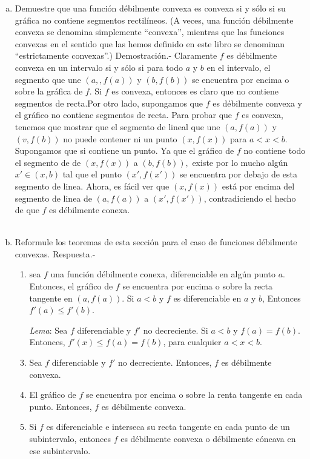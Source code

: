 \begin{enumerate}[\bfseries 1.]
\begin{enumerate}[(a)]
	    \item Demuestre que una función débilmente convexa es convexa si y sólo si su gráfica no contiene segmentos rectilíneos. (A veces, una función débilmente convexa se denomina simplemente “convexa”, mientras que las funciones convexas en el sentido que las hemos definido en este libro se denominan “estrictamente convexas”.)
		Demostración.-\; Claramente $f$ es débilmente convexa en un intervalo si y sólo si para todo $a$ y $b$ en el intervalo, el segmento que une $(a,,f(a))$ y $(b,f(b))$ se encuentra por encima o sobre la gráfica de $f$. Si $f$ es convexa, entonces es claro que no contiene segmentos de recta.Por otro lado, supongamos que $f$ es débilmente convexa y el gráfico no contiene segmentos de recta. Para probar que $f$ es convexa, tenemos que mostrar que el segmento de lineal que une $(a,f(a))$ y $(v,f(b))$ no puede contener ni un punto $(x,f(x))$ para $a<x<b$. Supongamos que si contiene un punto. Ya que el gráfico de $f$ no contiene todo el segmento de 
		de $(x,f(x))$ a $(b,f(b)),$ existe por lo mucho algún $x'\in (x,b)$ tal que el punto $(x',f(x'))$ se encuentra por debajo de esta segmento de linea. Ahora, es fácil ver que $(x,f(x))$ está por encima del segmento de linea de $(a,f(a))$ a $(x',f(x'))$, contradiciendo el hecho de que $f$ es débilmente conexa.\\\\

	    \item Reformule los teoremas de esta sección para el caso de funciones débilmente convexas.
		Respuesta.-\;
		\begin{enumerate}
		    \item sea $f$ una función débilmente conexa, diferenciable en algún punto $a$. Entonces, el gráfico de $f$ se encuentra por encima o sobre la recta tangente en $(a,f(a))$. Si $a<b$ y $f$ es diferenciable en $a$ y $b$, Entonces $f'(a)\leq f'(b)$.
		    \item[\textit{Lema}:] Sea $f$ diferenciable y $f'$ no decreciente. Si $a<b$ y $f(a)=f(b)$. Entonces, $f'(x)\leq f(a)=f(b)$, para cualquier $a<x<b$.
		    \item Sea $f$ diferenciable y $f'$ no decreciente. Entonces, $f$ es débilmente convexa.
		    \item El gráfico de $f$ se encuentra por encima o sobre la renta tangente en cada punto. Entonces, $f$ es débilmente convexa.
		    \item Si $f$ es diferenciable e interseca su recta tangente en cada punto de un subintervalo, entonces $f$ es débilmente convexa o débilmente cóncava en ese subintervalo.
		\end{enumerate}


\end{enumerate}
\end{enumerate}
